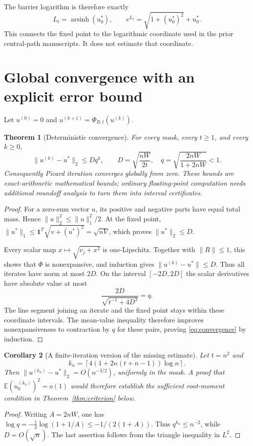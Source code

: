 \documentclass[11pt]{article}
\newtheorem{theorem}{Theorem}[section]
\newtheorem{corollary}[theorem]{Corollary}
\theoremstyle{remark}\newtheorem{remark}[theorem]{Remark}
\newcommand{\E}{\mathbb E}
\newcommand{\one}{\mathbf 1}
\DeclareMathOperator{\arsinh}{arsinh}
\begin{document}
The barrier logarithm is therefore exactly
\begin{equation}\label{eq:logroot}
 L_t=\arsinh(u^*_0),\qquad e^{L_t}=\sqrt{1+(u^*_0)^2}+u^*_0.
\end{equation}
This connects the fixed point to the logarithmic coordinate used in the prior
central-path manuscripts. It does not estimate that coordinate.

\section{Global convergence with an explicit error bound}
Let $u^{(0)}=0$ and $u^{(k+1)}=\Phi_{R,t}(u^{(k)})$.

\begin{theorem}[Deterministic convergence]\label{thm:convergence}
For every mask, every $t\ge1$, and every $k\ge0$,
\begin{equation}\label{eq:convergence}
 \|u^{(k)}-u^*\|_2\le Dq^k,\qquad
 D=\sqrt{\frac{nW}{2t}},\quad
 q=\sqrt{\frac{2nW}{1+2nW}}<1.
\end{equation}
Consequently Picard iteration converges globally from zero. These bounds are
exact-arithmetic mathematical bounds; ordinary floating-point computation
needs additional roundoff analysis to turn them into interval certificates.
\end{theorem}
\begin{proof}
For a zero-sum vector $u$, its positive and negative parts have equal total
mass. Hence $\|u\|_2^2\le\|u\|_1^2/2$. At the fixed point,
$\|u^*\|_1\le\one^T\sqrt{v+(u^*)^2}=\sqrt{nV}$, which proves
$\|u^*\|_2\le D$.

Every scalar map $x\mapsto\sqrt{v_j+x^2}$ is one-Lipschitz. Together with
$\|R\|\le1$, this shows that $\Phi$ is nonexpansive, and induction gives
$\|u^{(k)}-u^*\|\le D$. Thus all iterates have norm at most $2D$.
On the interval $[-2D,2D]$ the scalar derivatives have absolute value at most
\[
 \frac{2D}{\sqrt{t^{-1}+4D^2}}=q.
\]
The line segment joining an iterate and the fixed point stays within these
coordinate intervals. The mean-value inequality therefore improves
nonexpansiveness to contraction by $q$ for these pairs, proving
\eqref{eq:convergence} by induction.
\end{proof}

\begin{corollary}[A finite-iteration version of the missing estimate]\label{cor:finite}
Let $t=n^2$ and
\[
 k_n=\left\lceil4(1+2n(t+n-1))\log n\right\rceil.
\]
Then $\|u^{(k_n)}-u^*\|_2=O(n^{-3/2})$, uniformly in the mask.
A proof that $\E(u^{(k_n)}_0)^2=o(1)$ would therefore establish the sufficient
root-moment condition in Theorem~\ref{thm:criterion} below.
\end{corollary}
\begin{proof}
Writing $A=2nW$, one has
$\log q=-\tfrac12\log(1+1/A)\le-1/(2(1+A))$.
Thus $q^{k_n}\le n^{-2}$, while $D=O(\sqrt n)$.
The last assertion follows from the triangle inequality in $L^2$.
\end{proof}
\end{document}
